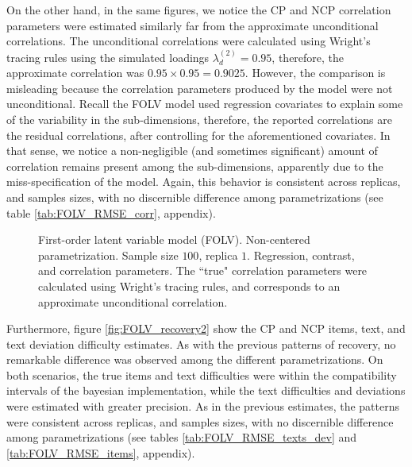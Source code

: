 On the other hand, in the same figures, we notice the CP and NCP correlation parameters were estimated similarly far from the approximate unconditional correlations. The unconditional correlations were calculated using Wright's tracing rules \cite{Beaujean_2014} using the simulated loadings $\lambda^{(2)}_{d} = 0.95$, therefore, the approximate correlation was $0.95 \times 0.95 = 0.9025$. However, the comparison is misleading because the correlation parameters produced by the model were not unconditional. Recall the FOLV model used regression covariates to explain some of the variability in the sub-dimensions, therefore, the reported correlations are the residual correlations, after controlling for the aforementioned covariates. In that sense, we notice a non-negligible (and sometimes significant) amount of correlation remains present among the sub-dimensions, apparently due to the miss-specification of the model. Again, this behavior is consistent across replicas, and samples sizes, with no discernible difference among parametrizations (see table \ref{tab:FOLV_RMSE_corr}, appendix).
%
\begin{figure}[H]
	\centering
	\begin{subfigure}
		\texttt{[image: FOLV\_NC\_J100\_Ndata1\_regression]}
	\end{subfigure}
	\begin{subfigure}
		\texttt{[image: FOLV\_NC\_J100\_Ndata1\_corr]}
	\end{subfigure}
	\caption[First-order latent variable model (FOLV). Non-centered parametrization. Sample size $100$, replica $1$. Regression, contrast, and correlation parameters.]%
	{First-order latent variable model (FOLV). Non-centered parametrization. Sample size $100$, replica $1$. Regression, contrast, and correlation parameters. The ``true" correlation parameters were calculated using Wright's tracing rules, and corresponds to an approximate unconditional correlation.}
	\label{fig:FOLV_NC_recovery1}
\end{figure}

Furthermore, figure \ref{fig:FOLV_recovery2} show the CP and NCP items, text, and text deviation difficulty estimates. As with the previous patterns of recovery, no remarkable difference was observed among the different parametrizations. On both scenarios, the true items and text difficulties were within the compatibility intervals of the bayesian implementation, while the text difficulties and deviations were estimated with greater precision. As in the previous estimates, the patterns were consistent across replicas, and samples sizes, with no discernible difference among parametrizations (see tables \ref{tab:FOLV_RMSE_texts_dev} and \ref{tab:FOLV_RMSE_items}, appendix).

